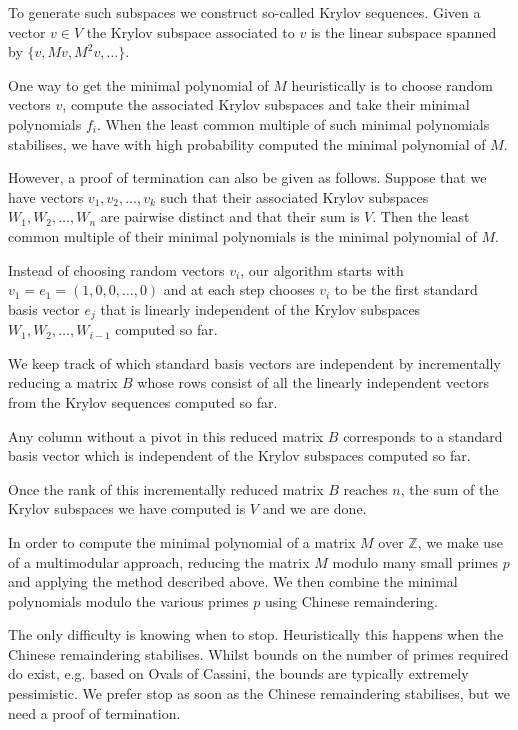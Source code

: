 \documentclass{sig-alternate-05-2015}
\begin{document}
To generate such subspaces we construct so-called Krylov sequences. Given
a vector $v \in V$ the Krylov subspace associated to $v$ is the linear
subspace spanned by $\{v, Mv, M^2v, \ldots\}$.

One way to get the minimal polynomial of $M$ heuristically is to choose
random vectors $v$, compute the associated Krylov subspaces and take their
minimal polynomials $f_i$. When the least common multiple of such minimal
polynomials stabilises, we have with high probability computed the minimal
polynomial of $M$.

However, a proof of termination can also be given as follows. Suppose that
we have vectors $v_1, v_2, \ldots, v_k$ such that their associated Krylov
subspaces $W_1, W_2, \ldots, W_n$ are pairwise distinct and that their
sum is $V$. Then the least common multiple of their minimal polynomials is
the minimal polynomial of $M$.

Instead of choosing random vectors $v_i$, our algorithm starts with
$v_1 = e_1 = (1, 0, 0, \ldots, 0)$ and at each step chooses $v_i$ to be
the first standard basis vector $e_j$ that is linearly independent of the
Krylov subspaces $W_1, W_2, \ldots, W_{i-1}$ computed so far.

We keep track of which standard basis vectors are independent by
incrementally reducing a matrix $B$ whose rows consist of all the
linearly independent vectors from the Krylov sequences computed so
far.

Any column without a pivot in this reduced matrix $B$ corresponds to a
standard basis vector which is independent of the Krylov subspaces
computed so far.

Once the rank of this incrementally reduced matrix $B$ reaches $n$, the sum
of the Krylov subspaces we have computed is $V$ and we are done.

In order to compute the minimal polynomial of a matrix $M$ over $\mathbb{Z}$,
we make use of a multimodular approach, reducing the matrix $M$ modulo many
small primes $p$ and applying the method described above. We then combine
the minimal polynomials modulo the various primes $p$ using Chinese
remaindering.

The only difficulty is knowing when to stop. Heuristically this happens
when the Chinese remaindering stabilises. Whilst bounds on the number of
primes required do exist, e.g. based on Ovals of Cassini, the bounds are
typically extremely pessimistic. We prefer stop as soon as the Chinese
remaindering stabilises, but we need a proof of termination. 
\end{document}
